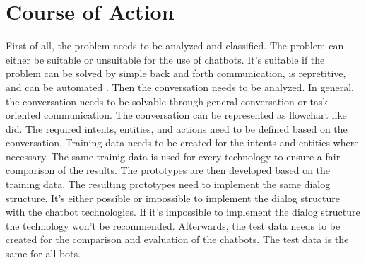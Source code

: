 

\section{Course of Action} %
First of all, the problem needs to be analyzed and classified.
The problem can either be suitable or unsuitable for the use of chatbots.
It's suitable if the problem can be solved by simple back and forth communication,
is repretitive, and can be automated \citet{singhbuilding}.
Then the conversation needs to be analyzed.
In general, the conversation needs to be solvable through general conversation or 
task-oriented communication.
The conversation can be represented as flowchart like \citet{singhbuilding} did.
The required intents, entities, and actions need to be defined based on the conversation.
Training data needs to be created for the intents and entities where necessary.
The same trainig data is used for every technology to ensure a fair 
comparison of the results.
The prototypes are then developed based on the training data.
The resulting prototypes need to implement the same dialog structure.
It's either possible or impossible to implement the dialog structure with the 
chatbot technologies. 
If it's impossible to implement the dialog structure the technology 
won't be recommended.
Afterwards, the test data needs to be created for the comparison and evaluation of 
the chatbots.
The test data is the same for all bots.


